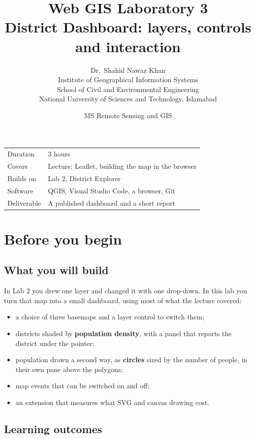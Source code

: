 \documentclass{article}
\title{Web GIS Laboratory 3\\[.3em]\large District Dashboard:
       layers, controls and interaction}
\author{Dr.\ Shahid Nawaz Khan\\
        Institute of Geographical Information Systems\\
        School of Civil and Environmental Engineering\\
        National University of Sciences and Technology, Islamabad}
\date{MS Remote Sensing and GIS}
\begin{document}
\maketitle

\begin{tabularx}{\textwidth}{@{}L{3.4cm} X@{}}
\toprule
Duration    & 3 hours \\
Covers      & Lecture: Leaflet, building the map in the browser \\
Builds on   & Lab 2, District Explorer \\
Software    & QGIS, Visual Studio Code, a browser, Git \\
Deliverable & A published dashboard and a short report \\
\bottomrule
\end{tabularx}

\tableofcontents


\section*{Before you begin}

\subsection*{What you will build}

In Lab 2 you drew one layer and changed it with one drop-down. In this
lab you turn that map into a small dashboard, using most of what the
lecture covered:

\begin{itemize}
  \item a choice of three basemaps and a layer control to switch them;
  \item districts shaded by \textbf{population density}, with a panel
        that reports the district under the pointer;
  \item population drawn a second way, as \textbf{circles} sized by the
        number of people, in their own pane above the polygons;
  \item map events that can be switched on and off;
  \item an extension that measures what SVG and canvas drawing cost.
\end{itemize}

\subsection*{Learning outcomes}
\end{document}
